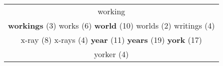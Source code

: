 \documentclass[12pt,a4paper]{article}
\begin{document}
\begin{center}
\begin{longtable}{|c|}
\textcolor{Amarelo} {working}} \footnotesize{(8)}  \\ {\small \textcolor{Laranja} {\bf workings}} \footnotesize{(3)} {\Large \textcolor{VermEscuro} {works}} \footnotesize{(6)} {\Huge \textcolor{AzulEscuro} {\bf world}} \footnotesize{(10)} {\footnotesize \textcolor{Verde} {worlds}} \footnotesize{(2)} {\normalsize \textcolor{VerdeLocao} {writings}} \footnotesize{(4)}  \\ {\huge \textcolor{Amarelo} {x-ray}} \footnotesize{(8)} {\normalsize \textcolor{VerdeLocao} {x-rays}} \footnotesize{(4)} {\Huge \textcolor{AzulEscuro} {\bf year}} \footnotesize{(11)} {\Huge \textcolor{AzulEscuro} {\bf years}} \footnotesize{(19)} {\Huge \textcolor{AzulEscuro} {\bf york}} \footnotesize{(17)}  \\ {\normalsize \textcolor{VerdeLocao} {yorker}} \footnotesize{(4)} 
 \\ \hline
\end{longtable}
\end{center}
\end{document}
